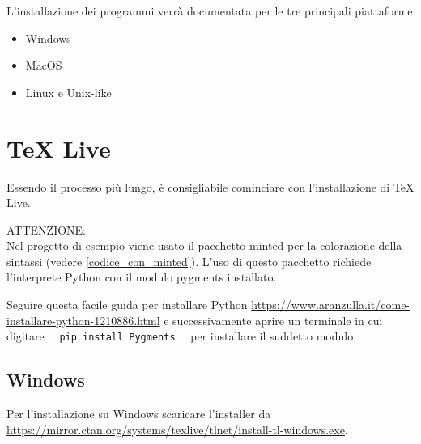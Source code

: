 \documentclass[envcountsame,envcountchap]{svmono}
\begin{document}
L'installazione dei programmi verrà documentata per le tre principali piattaforme
\begin{itemize}
    \item Windows
    \item MacOS
    \item Linux e Unix-like
\end{itemize}

\section{TeX Live}\label{sezione}
Essendo il processo più lungo, è consigliabile cominciare con l'installazione di TeX Live.

ATTENZIONE:\\
Nel progetto di esempio viene usato il pacchetto minted per la colorazione della sintassi (vedere \ref{codice_con_minted}).\label{esempio_url}
L'uso di questo pacchetto richiede l'interprete Python con il modulo pygments installato.

Seguire questa facile guida per installare Python \url{https://www.aranzulla.it/come-installare-python-1210886.html} e 
successivamente aprire un terminale in cui digitare \ \ {\tt pip install Pygments} \ \ per installare il suddetto modulo.

\subsection{Windows}\label{sottosezione}
Per l'installazione su Windows scaricare l'installer da \url{https://mirror.ctan.org/systems/texlive/tlnet/install-tl-windows.exe}.
\end{document}
